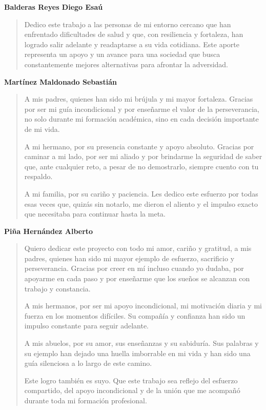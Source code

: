 
\noindent \textbf{Balderas Reyes Diego Esaú}
\begin{quote}
    Dedico este trabajo a las personas de mi entorno cercano que han enfrentado dificultades de salud y que, con resiliencia y fortaleza, han logrado salir adelante y readaptarse a su vida cotidiana. Este aporte representa un apoyo y un avance para una sociedad que busca constantemente mejores alternativas para afrontar la adversidad.
\end{quote}
\vspace{0.5cm} %

\noindent \textbf{Martínez Maldonado Sebastián}
\begin{quote}
    A mis padres, quienes han sido mi brújula y mi mayor fortaleza. Gracias por ser mi guía incondicional y por enseñarme el valor de la perseverancia, no solo durante mi formación académica, sino en cada decisión importante de mi vida.

    A mi hermano, por su presencia constante y apoyo absoluto. Gracias por caminar a mi lado, por ser mi aliado y por brindarme la seguridad de saber que, ante cualquier reto, a pesar de no demostrarlo, siempre cuento con tu respaldo.

    A mi familia, por su cariño y paciencia. Les dedico este esfuerzo por todas esas veces que, quizás sin notarlo, me dieron el aliento y el impulso exacto que necesitaba para continuar hasta la meta.

\end{quote}
\vspace{0.5cm}

\noindent \textbf{Piña Hernández Alberto}
\begin{quote}
    Quiero dedicar este proyecto con todo mi amor, cariño y gratitud, a mis padres, quienes han sido mi mayor ejemplo de esfuerzo, sacrificio y perseverancia. Gracias por creer en mí incluso cuando yo dudaba, por apoyarme en cada paso y por enseñarme que los sueños se alcanzan con trabajo y constancia.
    
    A mis hermanos, por ser mi apoyo incondicional, mi motivación diaria y mi fuerza en los momentos difíciles. Su compañía y confianza han sido un impulso constante para seguir adelante.
    
    A mis abuelos, por su amor, sus enseñanzas y su sabiduría. Sus palabras y su ejemplo han dejado una huella imborrable en mi vida y han sido una guía silenciosa a lo largo de este camino.
    
    Este logro también es suyo. Que este trabajo sea reflejo del esfuerzo compartido, del apoyo incondicional y de la unión que me acompañó durante toda mi formación profesional.

\end{quote}
\vspace{0.5cm}

